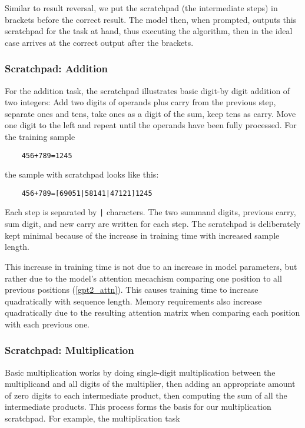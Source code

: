 Similar to result reversal, we put the scratchpad (the intermediate steps) in brackets before the correct result. The model then, when prompted, outputs this scratchpad for the task at hand, thus executing the algorithm, then in the ideal case arrives at the correct output after the brackets.

\subsubsection{Scratchpad: Addition}
\label{add_scratchpad}

For the addition task, the scratchpad illustrates basic digit-by digit addition of two integers: Add two digits of operands plus carry from the previous step, separate ones and tens, take ones as a digit of the sum, keep tens as carry. Move one digit to the left and repeat until the operands have been fully processed. For the training sample

\begin{lstlisting}
    456+789=1245
\end{lstlisting}

\noindent
the sample with scratchpad looks like this:

\begin{lstlisting}
    456+789=[69051|58141|47121]1245
\end{lstlisting}

\noindent
Each step is separated by \verb!|! characters. The two summand digits, previous carry, sum digit, and new carry are written for each step.
The scratchpad is deliberately kept minimal because of the increase in training time with increased sample length.

\label{training_time_growth}
This increase in training time is not due to an increase in model parameters, but rather due to the model's attention mecachism comparing one position to all previous positions (\cref{gpt2_attn}). This causes training time to increase quadratically with sequence length. Memory requirements also increase quadratically due to the resulting attention matrix when comparing each position with each previous one.

\subsubsection{Scratchpad: Multiplication}
\label{mul_scratchpad}

Basic multiplication works by doing single-digit multiplication between the multiplicand and all digits of the multiplier, then adding an appropriate amount of zero digits to each intermediate product, then computing the sum of all the intermediate products. This process forms the basis for our multiplication scratchpad. For example, the multiplication task

